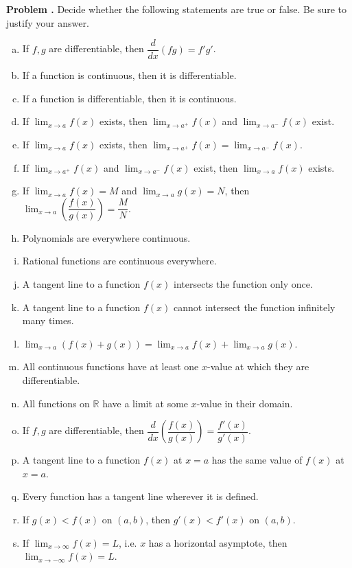 \documentclass[11pt,letterpaper]{article}
\newcommand{\ds}{\displaystyle}
\newcounter{problem}
\newcommand{\prob}{\stepcounter{problem}%
\noindent\textbf{Problem \theproblem. }}
\begin{document}
\prob Decide whether the following statements are true or false. Be sure to justify your answer.
        \begin{enumerate}[(a)]
        \item If $f, g$ are differentiable, then $\dfrac{d}{dx}(fg)= f' g'$.
        \item If a function is continuous, then it is differentiable. 
        \item If a function is differentiable, then it is continuous. 
        \item If $\ds\lim_{x \to a} f(x)$ exists, then $\ds\lim_{x \to a^+} f(x)$ and $\ds\lim_{x \to a^-} f(x)$ exist.
        \item If $\ds\lim_{x \to a} f(x)$ exists, then $\ds\lim_{x\to a^+} f(x)= \lim_{x \to a^-} f(x)$.
        \item If $\ds \lim_{x \to a^+} f(x)$ and $\ds\lim_{x \to a^-} f(x)$ exist, then $\ds\lim_{x \to a} f(x)$ exists.
        \item If $\ds\lim_{x \to a} f(x)= M$ and $\ds\lim_{x \to a} g(x)= N$, then $\ds\lim_{x \to a} \left( \dfrac{f(x)}{g(x)} \right)= \dfrac{M}{N}$.
        \item Polynomials are everywhere continuous.
        \item Rational functions are continuous everywhere.
        \item A tangent line to a function $f(x)$ intersects the function only once. 
        \item A tangent line to a function $f(x)$ cannot intersect the function infinitely many times.
        \item $\ds\lim_{x \to a}\left( f(x) + g(x) \right)= \lim_{x \to a} f(x) + \lim_{x \to a} g(x)$.
        \item All continuous functions have at least one $x$-value at which they are differentiable.
        \item All functions on $\mathbb{R}$ have a limit at some $x$-value in their domain.
        \item If $f, g$ are differentiable, then $\dfrac{d}{dx} \left( \dfrac{f(x)}{g(x)} \right)= \dfrac{f'(x)}{g'(x)}$. 
        \item A tangent line to a function $f(x)$ at $x= a$ has the same value of $f(x)$ at $x= a$.
        \item Every function has a tangent line wherever it is defined. 
        \item If $g(x) < f(x)$ on $(a, b)$, then $g'(x) < f'(x)$ on $(a, b)$.
        \item If $\ds\lim_{x \to \infty} f(x)= L$, i.e. $x$ has a horizontal asymptote, then $\ds\lim_{x \to -\infty} f(x)= L$. 

\end{enumerate}
\end{document}
